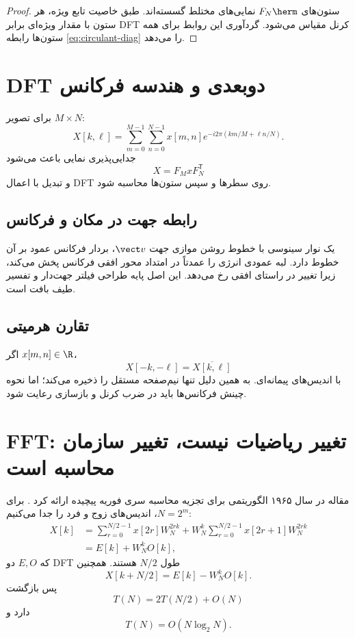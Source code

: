 \begin{proof}
ستون‌های \(F_N\herm\) نمایی‌های مختلط گسسته‌اند. طبق خاصیت تابع ویژه، هر ستون با مقدار ویژه‌ای برابر
DFT کرنل مقیاس می‌شود. گردآوری این روابط برای همه ستون‌ها رابطه \eqref{eq:circulant-diag} را می‌دهد.
\end{proof}

\section{DFT دوبعدی و هندسه فرکانس}

برای تصویر \(M\times N\):
\begin{equation}
X[k,\ell]=\sum_{m=0}^{M-1}\sum_{n=0}^{N-1}
 x[m,n]e^{-i2\pi(km/M+\ell n/N)}.
\end{equation}
جدایی‌پذیری نمایی باعث می‌شود
\begin{equation}
X=F_M x F_N^{\mathsf T}
\end{equation}
و تبدیل با اعمال DFT روی سطرها و سپس ستون‌ها محاسبه شود.

\subsection{رابطه جهت در مکان و فرکانس}
یک نوار سینوسی با خطوط روشن موازی جهت \(\vect v\)، بردار فرکانس عمود بر آن خطوط دارد. لبه عمودی
انرژی را عمدتاً در امتداد محور افقی فرکانس پخش می‌کند، زیرا تغییر در راستای افقی رخ می‌دهد. این اصل پایه
طراحی فیلتر جهت‌دار و تفسیر طیف بافت است.

\subsection{تقارن هرمیتی}
اگر \(x[m,n]\in\R\)،
\begin{equation}
X[-k,-\ell]=\overline{X[k,\ell]}
\end{equation}
با اندیس‌های پیمانه‌ای. به همین دلیل  تنها نیم‌صفحه مستقل را ذخیره می‌کند؛ اما نحوه چینش
فرکانس‌ها باید در ضرب کرنل و بازسازی رعایت شود.

\section{FFT: تغییر ریاضیات نیست، تغییر سازمان محاسبه است}

مقاله  در سال ۱۹۶۵ الگوریتمی برای تجزیه محاسبه سری فوریه پیچیده ارائه کرد
\cite{cooley1965fft}. برای \(N=2^m\)، اندیس‌های زوج و فرد را جدا می‌کنیم:
\begin{align}
X[k]
&=\sum_{r=0}^{N/2-1}x[2r]W_N^{2rk}
+W_N^k\sum_{r=0}^{N/2-1}x[2r+1]W_N^{2rk}\\
&=E[k]+W_N^kO[k],
\end{align}
که \(E,O\) دو DFT طول \(N/2\) هستند. همچنین
\begin{equation}
X[k+N/2]=E[k]-W_N^kO[k].
\end{equation}
پس بازگشت
\begin{equation}
T(N)=2T(N/2)+O(N)
\end{equation}
دارد و
\begin{equation}
T(N)=O(N\log_2N).
\end{equation}

